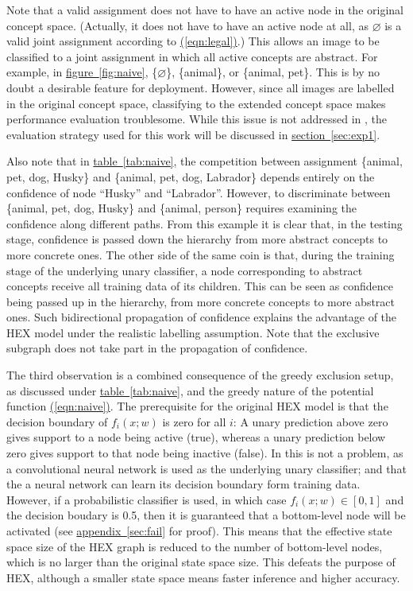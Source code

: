 \documentclass[11pt,a4paper]{article}
\begin{document}
Note that a valid assignment does not have to have an active node in the original concept space. (Actually, it does not have to have an active node at all, as $\varnothing$ is a valid joint assignment according to \hyperref[eqn:legal]{(\ref{eqn:legal})}.) This allows an image to be classified to a joint assignment in which all active concepts are abstract. For example, in \hyperref[fig:naive]{figure~\ref{fig:naive}}, \{$\varnothing$\}, \{animal\}, or \{animal, pet\}. This is by no doubt a desirable feature for deployment. However, since all images are labelled in the original concept space, classifying to the extended concept space makes performance evaluation troublesome. While this issue is not addressed in \cite{deng2014large}, the evaluation strategy used for this work will be discussed in \hyperref[sec:exp1]{section~\ref{sec:exp1}}.

Also note that in \hyperref[tab:naive]{table~\ref{tab:naive}}, the competition between assignment \{animal, pet, dog, Husky\} and \{animal, pet, dog, Labrador\} depends entirely on the confidence of node ``Husky'' and ``Labrador''. However, to discriminate between \{animal, pet, dog, Husky\} and \{animal, person\} requires examining the confidence along different paths. From this example it is clear that, in the testing stage, confidence is passed down the hierarchy from more abstract concepts to more concrete ones. The other side of the same coin is that, during the training stage of the underlying unary classifier, a node corresponding to abstract concepts receive all training data of its children. This can be seen as confidence being passed up in the hierarchy, from more concrete concepts to more abstract ones. Such bidirectional propagation of confidence explains the advantage of the HEX model under the realistic labelling assumption. Note that the exclusive subgraph does not take part in the propagation of confidence.

The third observation is a combined consequence of the greedy exclusion setup, as discussed under \hyperref[tab:naive]{table~\ref{tab:naive}}, and the greedy nature of the potential function \hyperref[eqn:naive]{(\ref{eqn:naive})}. The prerequisite for the original HEX model is that the decision boundary of $f_i(x;w)$ is zero for all $i$: A unary prediction above zero gives support to a node being active (true), whereas a unary prediction below zero gives support to that node being inactive (false). In \cite{deng2014large} this is not a problem, as a convolutional neural network \cite{krizhevsky2012imagenet} is used as the underlying unary classifier; and that the a neural network can learn its decision boundary form training data. However, if a probabilistic classifier is used, in which case $f_i(x;w)\in[0,1]$ and the decision boudary is 0.5, then it is guaranteed that a bottom-level node will be activated (see \hyperref[sec:fail]{appendix~\ref{sec:fail}} for proof). This means that the effective state space size of the HEX graph is reduced to the number of bottom-level nodes, which is no larger than the original state space size. This defeats the purpose of HEX, although a smaller state space means faster inference and higher accuracy.
\end{document}
